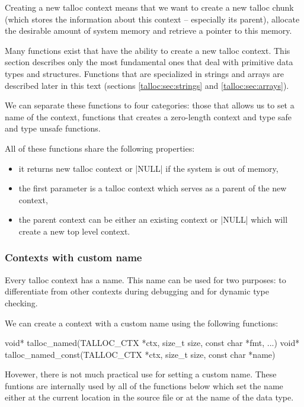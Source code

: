 Creating a new talloc context means that we want to create a new talloc chunk
(which stores the information about this context -- especially its parent),
allocate the desirable amount of system memory and retrieve a pointer to this
memory.

Many functions exist that have the ability to create a new talloc context. This
section describes only the most fundamental ones that deal with primitive data
types and structures. Functions that are specialized in strings and arrays are
described later in this text (sections \ref{talloc:sec:strings} and
\ref{talloc:sec:arrays}).

We can separate these functions to four categories: those that allows us to
set a name of the context, functions that creates a zero-length context and type
safe and type unsafe functions.

All of these functions share the following properties:
\begin{itemize}
  \item it returns new talloc context or |NULL| if the system is out of memory,
  \item the first parameter is a talloc context which serves as a parent of
  the new context,
  \item the parent context can be either an existing context or |NULL| which
  will create a new top level context.
\end{itemize}

\subsubsection{Contexts with custom name}

Every talloc context has a name. This name can be used for two purposes: to
differentiate from other contexts during debugging and for dynamic type
checking.

We can create a context with a custom name using the following functions: 

\begin{funcproto}
void* talloc_named(TALLOC_CTX *ctx, size_t size,
                   const char *fmt, ...)
void* talloc_named_const(TALLOC_CTX *ctx, size_t size,
                         const char *name)
\end{funcproto}
\funclistend
Hovewer, there is not much practical use for setting a custom name. These
funtions are internally used by all of the functions below which set the name
either at the current location in the source file or at the name of the data
type.

